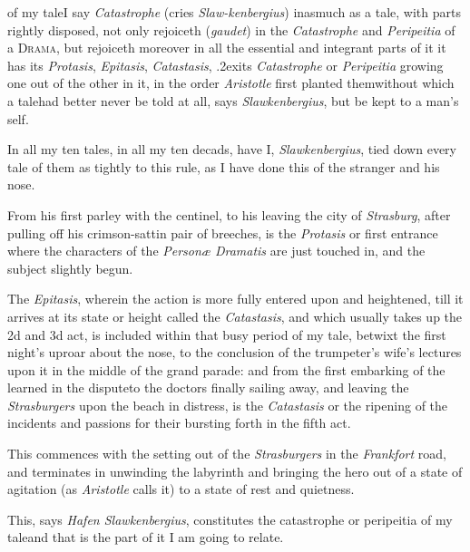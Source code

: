 \documentclass{article}
\begin{document}
\noindent
{}
of my tale\tsk I say \textit{Catastrophe} (cries
\textit{Slaw-\break kenbergius}) inasmuch as a
tale, with parts rightly disposed, not only rejoiceth
(\textit{gau\-det}) in the \textit{Catastrophe} and
\textit{Peripeitia} of\break
a \textsc{Drama}, but rejoiceth moreover in all the essential
and integrant parts of it\tsh\break
it has its \textit{Protasis}, \textit{Epitasis}, \textit{Catastasis},\break
\lower.2ex\hbox{i}ts \textit{Catastrophe} or
\textit{Peripeitia} growing one out of the other in it, in the order
\textit{Aristotle} first planted them\tsh without which a
tale\pb had better never be told at all, says\break
\textit{Slawkenbergius}, but be kept to a man’s\break
self.

In all my ten tales, in all my ten de\-cads, have I,
\textit{Slawkenbergius}, tied down every tale of them as
tightly to this rule, as I have done this of the stranger and\break
his nose.

\tsk From his first parley with the centi\-nel, to his
leaving the city of \textit{Strasburg}, after pulling off his
crimson-sattin pair of breeches, is the \textit{Protasis} or first
entrance\break
\tsk where the characters of the \textit{Personæ
Dramatis} are just touched in, and the subject slightly
begun.

The \textit{Epitasis}, wherein the action is\break
more fully entered upon and heightened,\break
till it arrives at its state or height called\pb
the \textit{Catastasis}, and which usually takes up the 2d and 3d
act, is included within that busy period of my tale, betwixt the
first night’s uproar about the nose, to the conclusion of the
trumpeter’s wife’s lectures upon it in the middle of
the grand parade: and from the first embarking of the learned in
the dispute\tsk to the doctors finally sailing away, and leaving
the \textit{Strasburgers} upon the beach in distress, is the
\textit{Catastasis} or the ripening of the incidents and passions for their bursting
forth in the fifth act.

This commences with the setting out of the \textit{Strasburgers}
in the \textit{Frankfort} road, and terminates in unwinding the
laby\-rinth and bringing the hero out of a state of agitation (as
\textit{Aristotle} calls it) to a state of rest and quietness.

\newpage
This, says \textit{Hafen Slawkenbergius}, constitutes the
catastrophe or peripeitia of my tale\tsk and that
is the part of it I am going to relate.
\end{document}
